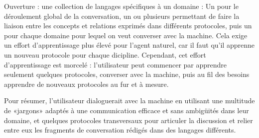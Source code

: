 \documentclass[french,a4paper]{article}
\begin{document}

Ouverture : une collection de langages spécifiques à un domaine : Un pour le déroulement global de la conversation, un ou plusieurs
permettant de faire la liaison entre les concepts et relations exprimés dans différents protocoles, puis un pour chaque domaine pour lequel
on veut converser avec la machine. Cela exige un effort d'apprentissage plus élevé pour l'agent naturel, car il faut qu'il apprenne un
nouveau protocole pour chaque dicipline. Cependant, cet effort d'apprentissage est morcelé : l'utilisateur peut commencer par apprendre
seulement quelques protocoles, converser avec la machine, puis au fil des besoins apprendre de nouveaux protocoles au fur et à mesure.

Pour résumer, l'utilisateur dialoguerait avec la machine en utilisant une multitude de «jargons» adaptés à une communication efficace et
sans ambigüités dans leur domaine, et quelques protocoles transversaux pour articuler la discussion et relier entre eux les fragments de
conversation rédigés dans des langages différents.

\end{document}
